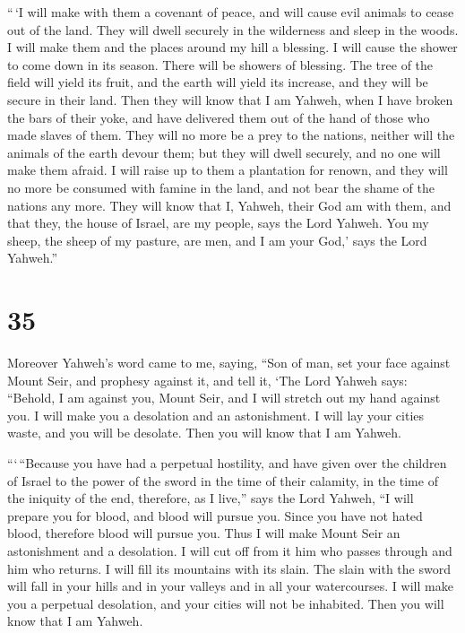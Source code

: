  ``\,`I will make with them a covenant of peace, and will
cause evil animals to cease out of the land. They will dwell securely in
the wilderness and sleep in the woods.  I will make them
and the places around my hill a blessing. I will cause the shower to
come down in its season. There will be showers of blessing.
 The tree of the field will yield its fruit, and the earth
will yield its increase, and they will be secure in their land. Then
they will know that I am Yahweh, when I have broken the bars of their
yoke, and have delivered them out of the hand of those who made slaves
of them.  They will no more be a prey to the nations,
neither will the animals of the earth devour them; but they will dwell
securely, and no one will make them afraid.  I will raise
up to them a plantation for renown, and they will no more be consumed
with famine in the land, and not bear the shame of the nations any more.
 They will know that I, Yahweh, their God am with them, and
that they, the house of Israel, are my people, says the Lord Yahweh.
 You my sheep, the sheep of my pasture, are men, and I am
your God,' says the Lord Yahweh.''

\hypertarget{section-33}{%
\section{35}\label{section-33}}

 Moreover Yahweh's word came to me, saying, 
``Son of man, set your face against Mount Seir, and prophesy against it,
 and tell it, `The Lord Yahweh says: ``Behold, I am against
you, Mount Seir, and I will stretch out my hand against you. I will make
you a desolation and an astonishment.  I will lay your
cities waste, and you will be desolate. Then you will know that I am
Yahweh.

 ```\,``Because you have had a perpetual hostility, and have
given over the children of Israel to the power of the sword in the time
of their calamity, in the time of the iniquity of the end, 
therefore, as I live,'' says the Lord Yahweh, ``I will prepare you for
blood, and blood will pursue you. Since you have not hated blood,
therefore blood will pursue you.  Thus I will make Mount
Seir an astonishment and a desolation. I will cut off from it him who
passes through and him who returns.  I will fill its
mountains with its slain. The slain with the sword will fall in your
hills and in your valleys and in all your watercourses.  I
will make you a perpetual desolation, and your cities will not be
inhabited. Then you will know that I am Yahweh.

